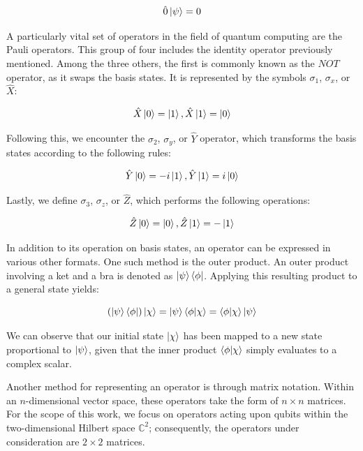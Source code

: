 \documentclass[en]{dimscthesis}
\begin{document}
\begin{equation}
	\hat{0}\ket{\psi} = 0
	\label{eq:operator_A_zero}
\end{equation}

A particularly vital set of operators in the field of quantum computing are the Pauli operators. This group of four includes the identity operator previously mentioned. Among the three others, the first is commonly known as the $NOT$ operator, as it swaps the basis states. It is represented by the symbols $\sigma_1$, $\sigma_x$, or $\hat{X}$:

\begin{equation}
	\hat{X}\ket{0} = \ket{1},   \hat{X}\ket{1} = \ket{0}
	\label{eq:operator_X}
\end{equation}

Following this, we encounter the $\sigma_2$, $\sigma_y$, or $\hat{Y}$ operator, which transforms the basis states according to the following rules:

\begin{equation}
	\hat{Y}\ket{0} = -i\ket{1},   \hat{Y}\ket{1} = i\ket{0}
	\label{eq:operator_Y}
\end{equation}

Lastly, we define $\sigma_3$, $\sigma_z$, or $\hat{Z}$, which performs the following operations:

\begin{equation}
	\hat{Z}\ket{0} = \ket{0},   \hat{Z}\ket{1} = -\ket{1}
	\label{eq:operator_Z}
\end{equation}

In addition to its operation on basis states, an operator can be expressed in various other formats. One such method is the outer product. An outer product involving a ket and a bra is denoted as $\ket{\psi}\bra{\phi}$. Applying this resulting product to a general state yields:

\begin{equation}
	(\ket{\psi}\bra{\phi})\ket{\chi} = \ket{\psi}\braket{\phi|\chi} = \braket{\phi|\chi}\ket{\psi}
	\label{eq:product_state}
\end{equation}

We can observe that our initial state $\ket{\chi}$ has been mapped to a new state proportional to $\ket{\psi}$, given that the inner product $\braket{\phi|\chi}$ simply evaluates to a complex scalar.

Another method for representing an operator is through matrix notation. Within an $n$-dimensional vector space, these operators take the form of $n \times n$ matrices. For the scope of this work, we focus on operators acting upon qubits within the two-dimensional Hilbert space $\mathbb{C}^2$; consequently, the operators under consideration are $2 \times 2$ matrices.
\end{document}
